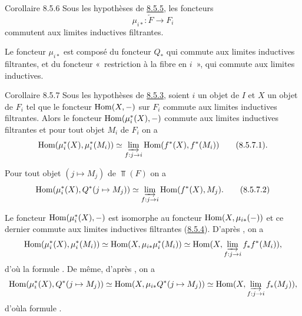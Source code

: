 \documentclass[10pt]{../fichiers-configuration-latex/smfart}
\begin{document}
\begin{enonce*}{Corollaire 8.5.6}
Sous les hypothèses de \hyperref[VI.cor8.5.5]{8.5.5}, les foncteurs
$$
\mu_{i\ast} : \underleftarrow{F} \to F_i
$$
commutent aux limites inductives filtrantes.
\end{enonce*}

Le foncteur $\mu_{i\ast}$ est composé du foncteur $Q_{\ast}$ qui
commute aux limites inductives filtrantes, et du foncteur « restriction à la fibre en $i$ », qui commute aux limites inductives.

\begin{enonce*}{Corollaire 8.5.7}
Sous les hypothèses de \hyperref[VI.prop8.5.3]{8.5.3}, soient $i$ un objet de $I$ et $X$ un
objet de $F_i$ tel que le foncteur $\operatorname{Hom}(X, -)$ sur $F_i$ commute aux
limites inductives filtrantes. Alors le foncteur $\operatorname{Hom}(\mu^{\ast}_i
(X), -)$ commute aux limites inductives filtrantes et pour tout objet
$M_i$ de $F_i$ on a
\begin{equation*}
\Hom(\mu^{\ast}_i(X), \mu^{\ast}_i(M_i)) \simeq \varinjlim_{f
: j \to i} \Hom(f^{\ast}(X), f^{\ast}(M_i))\tag{8.5.7.1}{\quoi}.
\end{equation*}
\end{enonce*}
\noindent
Pour tout objet $(j \mapsto M_j)$ de $\Top(F)$ on a
\begin{equation*}
\Hom(\mu^{\ast}_i(X), Q^{\ast}(j \mapsto M_j)) \simeq \varinjlim_{f
: j \to i} \Hom(f^{\ast}(X), M_{j}){\quoi}.\tag{8.5.7.2}
\end{equation*}

Le foncteur $\operatorname{Hom}(\mu^{\ast}_i (X), -)$ est isomorphe au foncteur
$\operatorname{Hom}(X, \mu_{i \ast} (-))$ et ce dernier commute aux limites
inductives filtrantes (\hyperref[VI.cor8.5.4]{8.5.4}). D'après , on a
$$
\Hom(\mu^{\ast}_i(X), \mu^{\ast}_i (M_i)) \simeq \Hom (X, \mu_{i\ast}
  \mu^{\ast}_i (M_i)) \simeq  \Hom(X, \varinjlim_{f : j \to
  i} f_{\ast} f^{\ast} (M_i)){\quoi},
$$
d'où la formule . De même, d'après , on a
$$
\Hom(\mu^{\ast}_i (X), Q^{\ast}(j \mapsto M_j)) \simeq \Hom(X,
\mu_{i\ast} Q^{\ast} (j \mapsto M_j)) \simeq \Hom(X,
\varinjlim_{f : j \to i} f_{\ast} (M_j)){\quoi},
$$
d'où\pageoriginale la formule .
\end{document}

